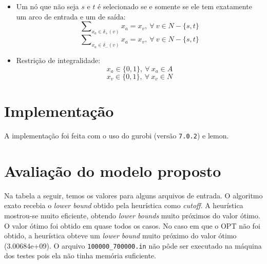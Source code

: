 \documentclass[7pt]{article}
\newcommand{\tit}[1]{\textit{#1}}
\newcommand{\ttt}[1]{\texttt{#1}}
\begin{document}
\begin{multicols}{2}
\begin{itemize}
    \item Um nó que não seja $s$ e $t$ é selecionado se e somente se ele tem
        exatamente um arco de entrada e um de saída:
        $$\sum\nolimits_{x_a \in \delta_+(v)}x_a = x_v, ~\forall~v \in N -
            \{s, t\}$$
        $$\sum\nolimits_{x_a \in \delta_-(v)}x_a = x_v, ~\forall~v \in N -
            \{s, t\}$$

    \item Restrição de integralidade:
        $$x_a \in \{0, 1\}, ~\forall~x_a \in A$$
        $$x_v \in \{0, 1\}, ~\forall~x_v \in N$$
\end{itemize}

\section{Implementação}
A implementação foi feita com o uso do gurobi (versão \ttt{7.0.2}) e lemon.

\section{Avaliação do modelo proposto}
Na tabela a seguir, temos os valores para alguns arquivos de entrada.
O algoritmo exato recebia o \tit{lower bound} obtido pela heurística
como \tit{cutoff}.
A heurística mostrou-se muito eficiente, obtendo \tit{lower bounds}
muito próximos do valor ótimo.
O valor ótimo foi obtido em quase todos os casos.
No caso em que o OPT não foi obtido, a heurística obteve um
\tit{lower bound} muito próximo do valor ótimo (3.00684e+09).
O arquivo \ttt{100000\_700000.in} não pôde ser executado na máquina dos
testes pois ela não tinha memória suficiente.
\end{multicols}


\end{document}
